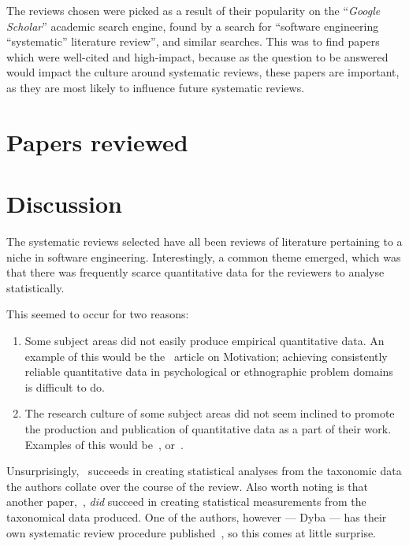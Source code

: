 The reviews chosen were picked as a result of their popularity on the ``\emph{Google Scholar}'' academic search engine, found by a search for ``software engineering ``systematic'' literature review'', and similar searches. This was to find papers which were well-cited and high-impact, because as the question to be answered would impact the culture around systematic reviews, these papers are important, as they are most likely to influence future systematic reviews.\par


\section{Papers reviewed}








\section{Discussion}\label{sec:discussion}
The systematic reviews selected have all been reviews of literature pertaining to a niche in software engineering. Interestingly, a common theme emerged, which was that there was frequently scarce quantitative data for the reviewers to analyse statistically.\par

This seemed to occur for two reasons:
\begin{enumerate}
    \item Some subject areas did not easily produce empirical quantitative data. An example of this would be the~\cite{Benavides} article on Motivation; achieving consistently reliable quantitative data in psychological or ethnographic problem domains is difficult to do.
    \item The research culture of some subject areas did not seem inclined to promote the production and publication of quantitative data as a part of their work. Examples of this would be~\cite{Chen2007}, or~\cite{Smite2010}. 
\end{enumerate}

Unsurprisingly,~\cite{Kitchenham2013} succeeds in creating statistical analyses from the taxonomic data the authors collate over the course of the review. Also worth noting is that another paper,~\cite{Kampanes2007}, \emph{did} succeed in creating statistical measurements from the taxonomical data produced. One of the authors, however --- Dyba --- has their own systematic review procedure published~\citep{dybaguidelines}, so this comes at little surprise.\par


